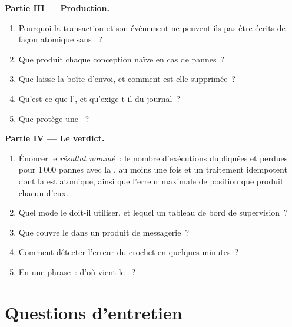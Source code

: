 \begin{problem}
\medskip\noindent\textbf{Partie III --- Production.}
\begin{enumerate}[resume]
\item Pourquoi la transaction et son événement ne peuvent-ils pas être écrits de façon atomique sans ~?
\item Que produit chaque conception naïve en cas de pannes~?
\item Que laisse la boîte d'envoi, et comment est-elle supprimée~?
\item Qu'est-ce que l', et qu'exige-t-il du journal~?
\item Que protège une ~?
\end{enumerate}

\medskip\noindent\textbf{Partie IV --- Le verdict.}
\begin{enumerate}[resume]
\item Énoncer le \emph{résultat nommé}~: le nombre d'exécutions dupliquées et perdues pour 1\,000 pannes avec la , au moins une fois et
un traitement idempotent dont la  est atomique, ainsi que l'erreur maximale de position que produit chacun d'eux.
\item Quel mode le  doit-il utiliser, et lequel un tableau de bord de supervision~?
\item Que couvre le  dans un produit de messagerie~?
\item Comment détecter l'erreur du crochet en quelques minutes~?
\item En une phrase~: d'où vient le ~?
\end{enumerate}
\end{problem}

\section{Questions d'entretien}

